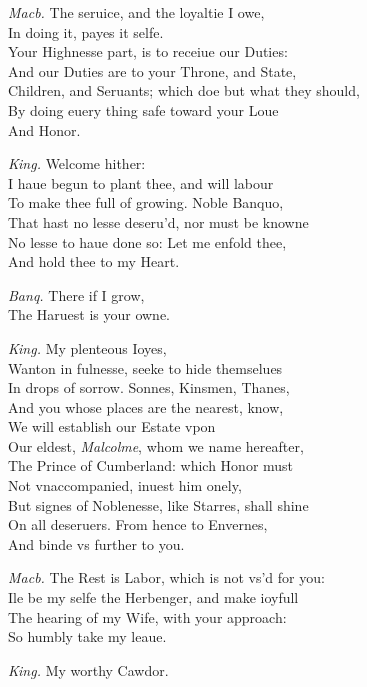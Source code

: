 \documentclass[12pt]{sides}
\newcommand{\dia}[1]{\hskip 15pt\textit{#1}\hskip 6pt}
\begin{document}
\begin{multicols}{2}
            \dia{Macb.} The seruice, and the loyaltie I owe, \\ In doing it, payes it selfe. \\ Your Highnesse part, is to receiue our Duties: \\ And our Duties are to your Throne, and State, \\ Children, and Seruants; which doe but what they should, \\ By doing euery thing safe toward your Loue \\ And Honor.

            \dia{King.} Welcome hither: \\ I haue begun to plant thee, and will labour \\ To make thee full of growing. Noble Banquo, \\ That hast no lesse deseru'd, nor must be knowne \\ No lesse to haue done so: Let me enfold thee, \\ And hold thee to my Heart.
            
            \dia{Banq.} There if I grow, \\ The Haruest is your owne.

            \dia{King.} My plenteous Ioyes, \\ Wanton in fulnesse, seeke to hide themselues \\ In drops of sorrow. Sonnes, Kinsmen, Thanes, \\ And you whose places are the nearest, know, \\ We will establish our Estate vpon \\ Our eldest, \textit{Malcolme}, whom we name hereafter, \\ The Prince of Cumberland: which Honor must \\ Not vnaccompanied, inuest him onely, \\ But signes of Noblenesse, like Starres, shall shine \\ On all deseruers. From hence to Envernes, \\ And binde vs further to you.

            \dia{Macb.} The Rest is Labor, which is not vs'd for you: \\ Ile be my selfe the Herbenger, and make ioyfull \\ The hearing of my Wife, with your approach: \\ So humbly take my leaue.
            
            \dia{King.} My worthy Cawdor.


\end{multicols}
\end{document}
